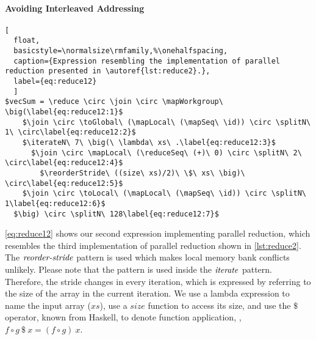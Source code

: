 \paragraph{Avoiding Interleaved Addressing}
\begin{lstlisting}[
  float,
  basicstyle=\normalsize\rmfamily,%\onehalfspacing,
  caption={Expression resembling the implementation of parallel reduction presented in \autoref{lst:reduce2}.},
  label={eq:reduce12}
  ]
$vecSum = \reduce \circ \join \circ \mapWorkgroup\ \big(\label{eq:reduce12:1}$
    $\join \circ \toGlobal\ (\mapLocal\ (\mapSeq\ \id)) \circ \splitN\ 1\ \circ\label{eq:reduce12:2}$
    $\iterateN\ 7\ \big(\ \lambda\ xs\ .\label{eq:reduce12:3}$
      $\join \circ \mapLocal\ (\reduceSeq\ (+)\ 0) \circ \splitN\ 2\ \circ\label{eq:reduce12:4}$
        $\reorderStride\ ((size\ xs)/2)\ \$\ xs\ \big)\ \circ\label{eq:reduce12:5}$
    $\join \circ \toLocal\ (\mapLocal\ (\mapSeq\ \id)) \circ \splitN\ 1\label{eq:reduce12:6}$
  $\big) \circ \splitN\ 128\label{eq:reduce12:7}$
\end{lstlisting}
%
\autoref{eq:reduce12} shows our second expression implementing parallel reduction, which resembles the third implementation of parallel reduction shown in \autoref{lst:reduce2}.
The $\text{\textit{reorder-stride}}$ pattern is used which makes local memory bank conflicts unlikely.
Please note that the pattern is used inside the $\text{\textit{iterate}}$ pattern.
Therefore, the stride changes in every iteration, which is expressed by referring to the size of the array in the current iteration.
We use a lambda expression to name the input array ($xs$), use a $size$ function to access its size, and use the $\$$ operator, known from Haskell, to denote function application, \ie, $f \circ g\ \$\ x = (f\circ g)\ x$.


